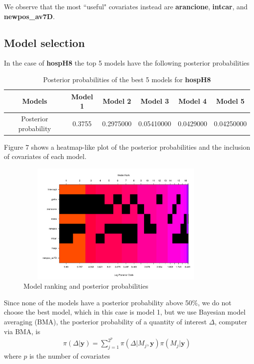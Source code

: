 \documentclass[12pt,a4paper]{article}
\theoremstyle{definition}
\theoremstyle{remark}
\begin{document}
We observe that the most ``useful" covariates instead are \textbf{arancione}, \textbf{intcar}, and \textbf{newpos\_av7D}.

\subsection{Model selection}

In the case of \textbf{hospH8} the top 5 models have the following posterior probabilities

\begin{table}[htb!]
	\centering
	\begin{tabular}{|c|c|c|c|c|c|}
		\hline
		Models                & Model 1 & Model 2   & Model 3    & Model 4   & Model 5    \\ \hline
		Posterior probability & 0.3755  & 0.2975000 & 0.05410000 & 0.0429000 & 0.04250000 \\ \hline
	\end{tabular}
	\caption{Posterior probabilities of the best 5 models for \textbf{hospH8}}
\end{table}
Figure 7 shows a heatmap-like plot of the posterior probabilities and the inclusion of covariates of each model.

\begin{figure}[htb!]
	\centering
	\includegraphics[width=100mm, height=60mm,scale=0.5]{modelranking.pdf}
	\caption{Model ranking and posterior probabilities }
\end{figure}



Since none of the models have a posterior probability above 50\%, we do not choose the best model, which in this case is model 1, but we use Bayesian model averaging (BMA), the posterior probability of a quantity of interest $\Delta$, computer via BMA, is
\begin{align*}
	\pi(\Delta|\mathbf{y}) = \sum_{j=1}^{2^p}\pi(\Delta| M_j, \mathbf{y})\pi(M_j|\mathbf{y})
\end{align*}
where $p$ is the number of covariates
\end{document}
